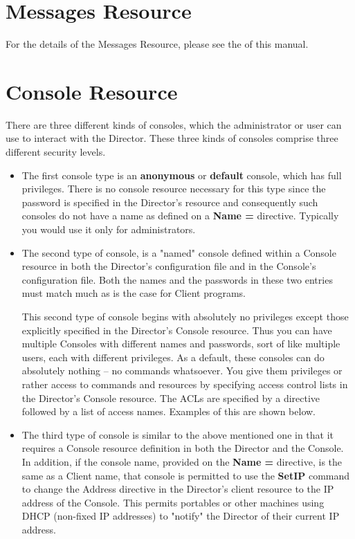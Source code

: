 \section{Messages Resource}
\label{MessagesResource2}

For the details of the Messages Resource, please see the
 of this
manual.

\section{Console Resource}
\label{ConsoleResource1}

There are three different kinds of consoles, which the administrator or
user can use to interact with the Director. These three kinds of consoles
comprise three different security levels.

\begin{itemize}
\item The first console type is an {\bf anonymous} or {\bf default}  console,
which has full privileges.  There is no console resource necessary for
this type since the password is specified in the Director's resource and
consequently such consoles do not have a name as defined on a {\bf Name
=} directive.  Typically you
would use it only for  administrators.

\item The second type of console, is a
"named" console defined within a Console resource in both the Director's
configuration file and in the Console's configuration file.  Both the
names and the passwords in these two entries must match much as is the
case for Client programs.

This second type of console begins with absolutely no privileges except
those explicitly specified in the Director's Console resource.  Thus you
can have multiple Consoles with different names and passwords, sort of
like multiple users, each with different privileges.  As a default,
these consoles can do absolutely nothing -- no commands whatsoever.  You
give them privileges or rather access to commands and resources by
specifying access control lists in the Director's Console resource.  The
ACLs are specified by a directive followed by a list of access names.
Examples of this are shown below.

\item The third type of console is similar to the above mentioned  one in that
it requires a Console resource definition in both the Director and the
Console.  In addition, if the console name, provided on the {\bf Name =}
directive, is the same as a Client name, that console is permitted to
use the {\bf SetIP} command to change the Address directive in the
Director's client resource to the IP address of the Console.  This
permits portables or other machines using DHCP (non-fixed IP addresses)
to "notify" the Director of their current IP address.
\end{itemize}

